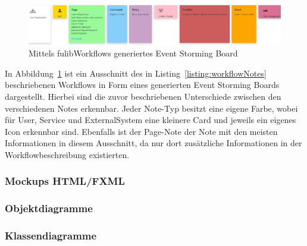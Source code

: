 \begin{figure}[h]
    \centering
    \includegraphics[width=1.0\textwidth]{images/3.1/board}
    \caption{Mittels fulibWorkflows generiertes Event Storming Board}
    \label{fig:generated-board}
\end{figure}

In Abbildung~\ref{fig:generated-board} ist ein Ausschnitt des in Listing~\ref{listing:workflowNotes} beschriebenen Workflows in
Form eines generierten Event Storming Boards dargestellt.
Hierbei sind die zuvor beschriebenen Unterschiede zwischen den verschiedenen Notes erkennbar.
Jeder Note-Typ besitzt eine eigene Farbe, wobei für User, Service und ExternalSystem eine kleinere Card und jeweils ein
eigenes Icon erkennbar sind.
Ebenfalls ist der Page-Note der Note mit den meisten Informationen in diesem Ausschnitt, da nur dort zusätzliche Informationen
in der Workflowbeschreibung existierten.

\subsubsection{Mockups HTML/FXML}

\subsubsection{Objektdiagramme}

\subsubsection{Klassendiagramme}
